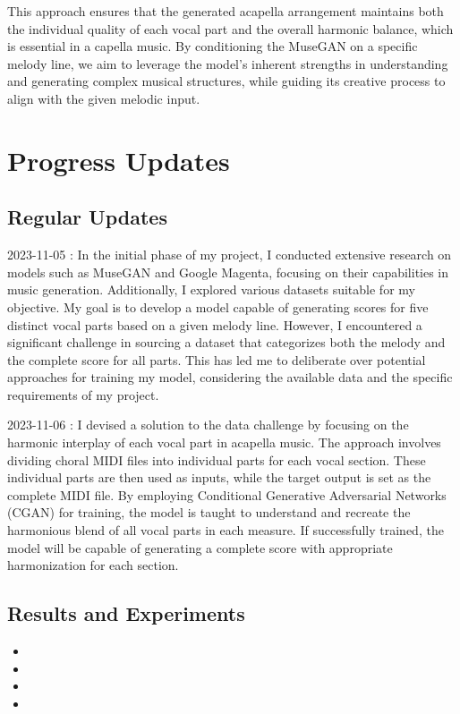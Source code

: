 \documentclass[conference]{IEEEtran}
\begin{document}
This approach ensures that the generated acapella arrangement maintains both the individual quality of each vocal part and the overall harmonic balance, which is essential in a capella music. By conditioning the MuseGAN on a specific melody line, we aim to leverage the model's inherent strengths in understanding and generating complex musical structures, while guiding its creative process to align with the given melodic input.



\section{Progress Updates}
\subsection{Regular Updates}\label{AA}
2023-11-05 : In the initial phase of my project, I conducted extensive research on models such as MuseGAN and Google Magenta, focusing on their capabilities in music generation. Additionally, I explored various datasets suitable for my objective. My goal is to develop a model capable of generating scores for five distinct vocal parts based on a given melody line. However, I encountered a significant challenge in sourcing a dataset that categorizes both the melody and the complete score for all parts. This has led me to deliberate over potential approaches for training my model, considering the available data and the specific requirements of my project.

2023-11-06 : I devised a solution to the data challenge by focusing on the harmonic interplay of each vocal part in acapella music. The approach involves dividing choral MIDI files into individual parts for each vocal section. These individual parts are then used as inputs, while the target output is set as the complete MIDI file. By employing Conditional Generative Adversarial Networks (CGAN) for training, the model is taught to understand and recreate the harmonious blend of all vocal parts in each measure. If successfully trained, the model will be capable of generating a complete score with appropriate harmonization for each section.



\subsection{Results and Experiments}
\begin{itemize}
\item 
\item 
\item 
\item 
\end{itemize}
\end{document}
